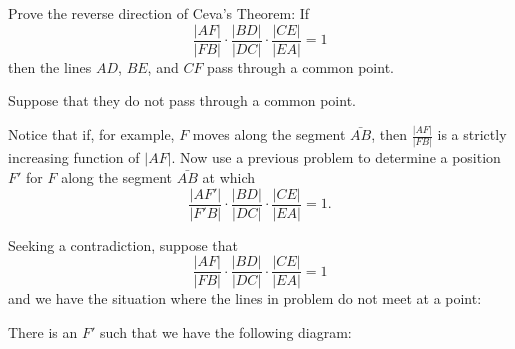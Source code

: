 \documentclass[newpage,hints,handout]{ximera}
\begin{document}
\begin{problem}
Prove the reverse direction of Ceva's Theorem: If%
\[
\frac{|AF|}{|FB|}\cdot\frac{|BD|}{|DC|}\cdot\frac{|CE|}{|EA|}=1
\]
then the lines $AD$, $BE$, and $CF$ pass through a common point.
\begin{hint}
Suppose that they do not pass through a common point.
\begin{image}
\end{image}
\end{hint}
\begin{hint}
Notice that if, for example, $F$ moves along the segment $\bar{AB}$,
then $\frac{|AF|}{|FB|}$ is a strictly increasing function of
$|AF|$. Now use a previous problem to determine a position $F'$ for
$F$ along the segment $\bar{AB}$ at which
\[
\frac{|AF'|}{|F'B|}\cdot\frac{|BD|}{|DC|}\cdot\frac{|CE|}{|EA|}=1.
\]
\end{hint}
\begin{freeResponse}
Seeking a contradiction, suppose that 
\[
\frac{|AF|}{|FB|}\cdot\frac{|BD|}{|DC|}\cdot\frac{|CE|}{|EA|}=1
\]
and we have the situation where the lines in problem do not meet at a point:
\begin{image}
\end{image}
There is an $F'$ such that we have the following diagram:
\begin{image}
\end{image}
\end{freeResponse}
\end{problem}
\end{document}

